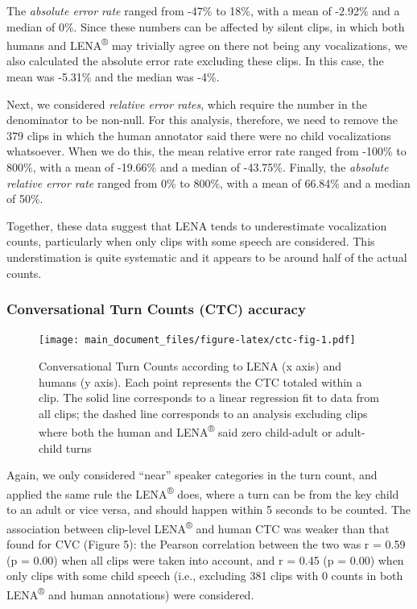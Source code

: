 \documentclass[english,floatsintext,man]{apa6}
\begin{document}
The \emph{absolute error rate} ranged from -47\% to 18\%, with a mean of
-2.92\% and a median of 0\%. Since these numbers can be affected by
silent clips, in which both humans and LENA\textsuperscript{®} may
trivially agree on there not being any vocalizations, we also calculated
the absolute error rate excluding these clips. In this case, the mean
was -5.31\% and the median was -4\%.

Next, we considered \emph{relative error rates}, which require the
number in the denominator to be non-null. For this analysis, therefore,
we need to remove the 379 clips in which the human annotator said there
were no child vocalizations whatsoever. When we do this, the mean
relative error rate ranged from -100\% to 800\%, with a mean of -19.66\%
and a median of -43.75\%. Finally, the \emph{absolute relative error
rate} ranged from 0\% to 800\%, with a mean of 66.84\% and a median of
50\%.

Together, these data suggest that LENA tends to underestimate
vocalization counts, particularly when only clips with some speech are
considered. This understimation is quite systematic and it appears to be
around half of the actual counts.

\subsubsection{Conversational Turn Counts (CTC)
accuracy}\label{conversational-turn-counts-ctc-accuracy}

\begin{figure}
\centering
\texttt{[image: main\_document\_files/figure-latex/ctc-fig-1.pdf]}
\caption{\label{fig:ctc-fig}Conversational Turn Counts according to LENA (x
axis) and humans (y axis). Each point represents the CTC totaled within
a clip. The solid line corresponds to a linear regression fit to data
from all clips; the dashed line corresponds to an analysis excluding
clips where both the human and LENA\textsuperscript{®} said zero
child-adult or adult-child turns}
\end{figure}

Again, we only considered \enquote{near} speaker categories in the turn
count, and applied the same rule the LENA\textsuperscript{®} does, where
a turn can be from the key child to an adult or vice versa, and should
happen within 5 seconds to be counted. The association between
clip-level LENA\textsuperscript{®} and human CTC was weaker than that
found for CVC (Figure 5): the Pearson correlation between the two was r
= 0.59 (p = 0.00) when all clips were taken into account, and r = 0.45
(p = 0.00) when only clips with some child speech (i.e., excluding 381
clips with 0 counts in both LENA\textsuperscript{®} and human
annotations) were considered.
\end{document}
